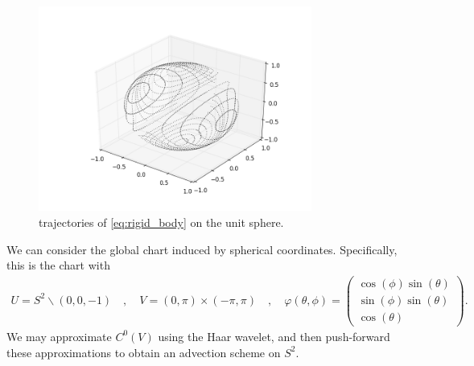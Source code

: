 \documentclass[letterpaper, 12 pt]{amsart}
\begin{document}
\begin{figure}[h]
  \centering
  \includegraphics[width=0.8\textwidth]{./images/rigid_body_traj.png}
  \caption{trajectories of \eqref{eq:rigid_body} on the unit sphere.}
  \label{fig:rigid_body_traj}
\end{figure}
We can consider the global chart induced by spherical coordinates.
Specifically, this is the chart with
\begin{align*}
  U = S^2 \backslash (0,0,-1) \quad,\quad
  V = (0,\pi) \times (-\pi,\pi) \quad,\quad
  \varphi(\theta,\phi) = \begin{pmatrix}
    \cos(\phi) \sin(\theta) \\
    \sin(\phi) \sin(\theta) \\
    \cos(\theta)
    \end{pmatrix}.
\end{align*}
We may approximate $C^0(V)$ using the Haar wavelet,
and then push-forward these approximations
to obtain an advection scheme on $S^2$.
\end{document}
